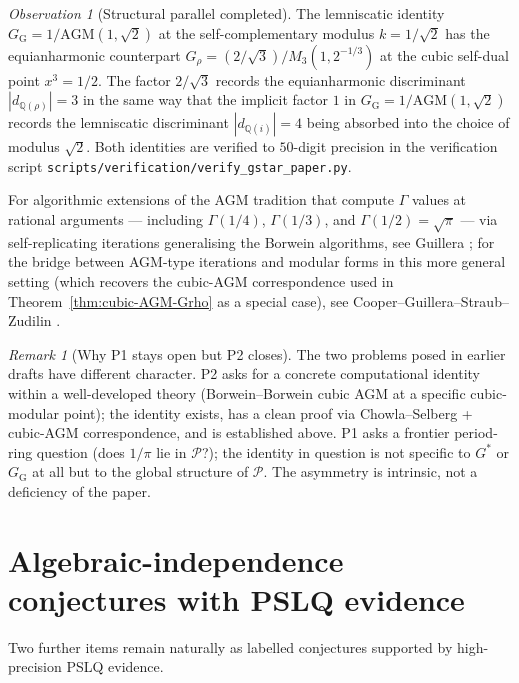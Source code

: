 \documentclass[11pt]{article}
\theoremstyle{definition}
\theoremstyle{remark}
\newtheorem*{remark}{Remark}
\newtheorem*{observation}{Observation}
\newcommand{\Gs}{G^{*}}
\newcommand{\GG}{G_{\!\scriptscriptstyle\mathrm{G}}}
\newcommand{\Q}{\mathbb{Q}}
\newcommand{\AGM}{\mathrm{AGM}}
\begin{document}
\begin{observation}[Structural parallel completed]\label{obs:cubic-agm-parallel}
The lemniscatic identity $\GG = 1/\AGM(1, \sqrt 2)$ at the self-complementary
modulus $k = 1/\sqrt 2$ has the equianharmonic counterpart
$G_\rho = (2/\sqrt 3)/M_3(1, 2^{-1/3})$ at the cubic self-dual point
$x^{3} = 1/2$. The factor $2/\sqrt 3$ records the equianharmonic
discriminant $|d_{\Q(\rho)}| = 3$ in the same way that the implicit
factor $1$ in $\GG = 1/\AGM(1, \sqrt 2)$ records the lemniscatic
discriminant $|d_{\Q(i)}| = 4$ being absorbed into the choice of
modulus $\sqrt 2$. Both identities are verified to $50$-digit
precision in the verification script
\texttt{scripts/verification/verify\_gstar\_paper.py}.

For algorithmic extensions of the AGM tradition that compute $\Gamma$
values at rational arguments --- including $\Gamma(1/4)$, $\Gamma(1/3)$,
and $\Gamma(1/2) = \sqrt\pi$ --- via self-replicating iterations
generalising the Borwein algorithms, see Guillera
\cite{guillera-selfreplication}; for the bridge between AGM-type
iterations and modular forms in this more general setting (which
recovers the cubic-AGM correspondence used in
Theorem~\ref{thm:cubic-AGM-Grho} as a special case), see
Cooper--Guillera--Straub--Zudilin \cite{cooper-guillera-straub-zudilin}.
\end{observation}

\begin{remark}[Why P1 stays open but P2 closes]
The two problems posed in earlier drafts have different character. P2
asks for a concrete computational identity within a well-developed
theory (Borwein--Borwein cubic AGM at a specific cubic-modular point);
the identity exists, has a clean proof via Chowla--Selberg + cubic-AGM
correspondence, and is established above. P1 asks a frontier
period-ring question (does $1/\pi$ lie in $\mathcal{P}$?); the
identity in question is not specific to $\Gs$ or $\GG$ at all but to
the global structure of $\mathcal{P}$. The asymmetry is intrinsic, not
a deficiency of the paper.
\end{remark}

\section{Algebraic-independence conjectures with PSLQ evidence}\label{sec:conjectures}

Two further items remain naturally as labelled conjectures supported by
high-precision PSLQ evidence.
\end{document}
